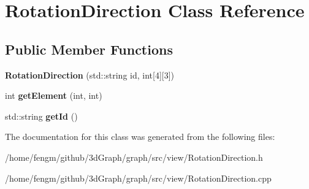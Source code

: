 \hypertarget{class_rotation_direction}{}\section{Rotation\+Direction Class Reference}
\label{class_rotation_direction}
\subsection*{Public Member Functions}
\begin{DoxyCompactItemize}
\item 
\mbox{\label{class_rotation_direction_a2b047c31af863b36a9784b0f0106fce6}} 
{\bfseries Rotation\+Direction} (std\+::string id, int\mbox{[}4\mbox{]}\mbox{[}3\mbox{]})
\item 
\mbox{\label{class_rotation_direction_aa01d94555b8466041ccb308cd62c578d}} 
int {\bfseries get\+Element} (int, int)
\item 
\mbox{\label{class_rotation_direction_a60a88b3ee6de486e156e797b7419093c}} 
std\+::string {\bfseries get\+Id} ()
\end{DoxyCompactItemize}


The documentation for this class was generated from the following files\+:\begin{DoxyCompactItemize}
\item 
/home/fengm/github/3d\+Graph/graph/src/view/Rotation\+Direction.\+h\item 
/home/fengm/github/3d\+Graph/graph/src/view/Rotation\+Direction.\+cpp\end{DoxyCompactItemize}
